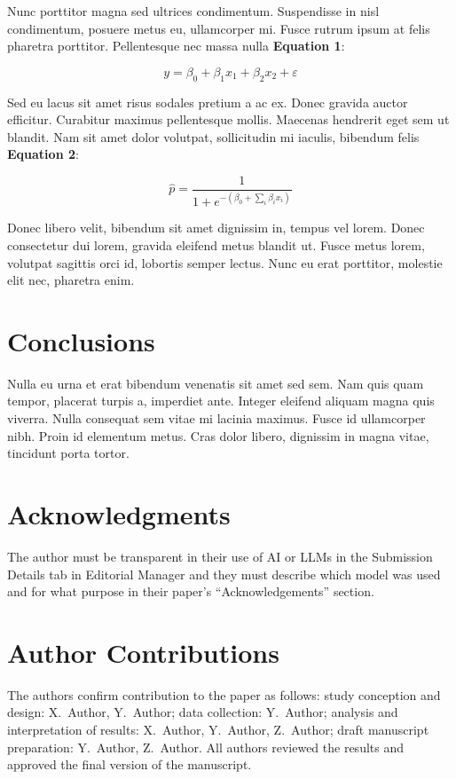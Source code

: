 \documentclass[12pt,letterpaper]{article}
\begin{document}
Nunc porttitor magna sed ultrices condimentum. Suspendisse in nisl condimentum, posuere
metus eu, ullamcorper mi. Fusce rutrum ipsum at felis pharetra porttitor. Pellentesque
nec massa nulla \textbf{Equation 1}:

\begin{equation}
  y = \beta_0 + \beta_1 x_1 + \beta_2 x_2 + \varepsilon
\end{equation}

Sed eu lacus sit amet risus sodales pretium a ac ex. Donec gravida auctor efficitur.
Curabitur maximus pellentesque mollis. Maecenas hendrerit eget sem ut blandit. Nam sit
amet dolor volutpat, sollicitudin mi iaculis, bibendum felis \textbf{Equation 2}:

\begin{equation}
  \hat{p} = \frac{1}{1 + e^{-(\beta_0 + \sum_i \beta_i x_i)}}
\end{equation}

Donec libero velit, bibendum sit amet dignissim in, tempus vel lorem. Donec consectetur
dui lorem, gravida eleifend metus blandit ut. Fusce metus lorem, volutpat sagittis orci
id, lobortis semper lectus. Nunc eu erat porttitor, molestie elit nec, pharetra enim.

\section{Conclusions}
Nulla eu urna et erat bibendum venenatis sit amet sed sem. Nam quis quam tempor,
placerat turpis a, imperdiet ante. Integer eleifend aliquam magna quis viverra. Nulla
consequat sem vitae mi lacinia maximus. Fusce id ullamcorper nibh. Proin id elementum
metus. Cras dolor libero, dignissim in magna vitae, tincidunt porta tortor.

\section{Acknowledgments}
The author must be transparent in their use of AI or LLMs in the Submission Details tab
in Editorial Manager and they must describe which model was used and for what purpose in
their paper's ``Acknowledgements'' section.

\section{Author Contributions}
The authors confirm contribution to the paper as follows: study conception and design:
X.\ Author, Y.\ Author; data collection: Y.\ Author; analysis and interpretation of
results: X.\ Author, Y.\ Author, Z.\ Author; draft manuscript preparation: Y.\ Author,
Z.\ Author. All authors reviewed the results and approved the final version of the
manuscript.
\end{document}
